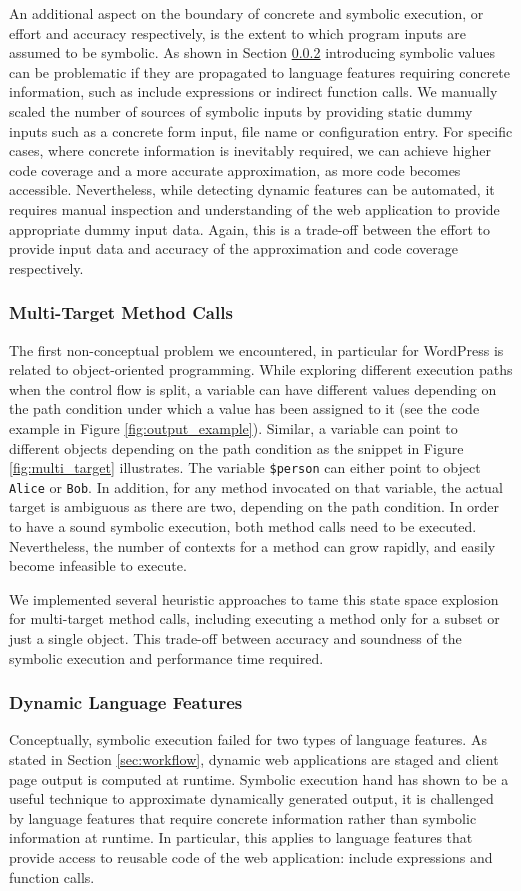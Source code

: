 \documentclass[sigconf]{acmart}
\renewcommand{\sf}[1]{\textsf{#1}}
\renewcommand{\tt}[1]{\texttt{#1}}
\begin{document}
An additional aspect on the boundary of concrete and symbolic execution, or
effort and accuracy respectively, is the extent to which program inputs are
assumed to be symbolic. As shown in Section \ref{} introducing symbolic values
can be problematic if they are propagated to language features requiring
concrete information, such as include expressions or indirect function calls.
We manually scaled the number of sources of symbolic inputs by providing static
dummy inputs such as a concrete form input, file name or configuration entry.
For specific cases, where concrete information is inevitably required, we can
achieve higher code coverage and a more accurate approximation, as more code
becomes accessible. Nevertheless, while detecting dynamic features can be
automated, it requires manual inspection and understanding of the web
application to provide appropriate dummy input data. Again, this is a trade-off
between the effort to provide input data and accuracy of the approximation and
code coverage respectively.

\subsubsection{Multi-Target Method Calls}
The first non-conceptual problem we encountered, in particular for
\sf{WordPress} is related to object-oriented programming. While exploring
different execution paths when the control flow is split, a variable can have
different values depending on the path condition under which a value has been
assigned to it (see the code example in Figure \ref{fig:output_example}). Similar, a variable
can point to different objects depending on the path condition as the snippet in
Figure \ref{fig:multi_target} illustrates. The variable \tt{\$person} can either
point to object \tt{Alice} or \tt{Bob}. In addition, for any method invocated on
that variable, the actual target is ambiguous as there are two, depending on the
path condition. In order to have a sound symbolic execution, both method calls
need to be executed. Nevertheless, the number of contexts for a method can grow
rapidly, and easily become infeasible to execute.

We implemented several heuristic approaches to tame this state space explosion
for multi-target method calls, including executing a method only for a subset or
just a single object. This trade-off between accuracy and soundness
of the symbolic execution and performance time required.

\subsubsection{Dynamic Language Features}
Conceptually, symbolic execution failed for two types of language features. As
stated in Section \ref{sec:workflow}, dynamic web applications are staged and client page
output is computed at runtime. Symbolic execution hand has shown to be a useful
technique to approximate dynamically generated output, it is challenged by
language features that require concrete information rather than symbolic
information at runtime. In particular, this applies to language features that
provide access to reusable code of the web application: include expressions and
function calls.
\end{document}
